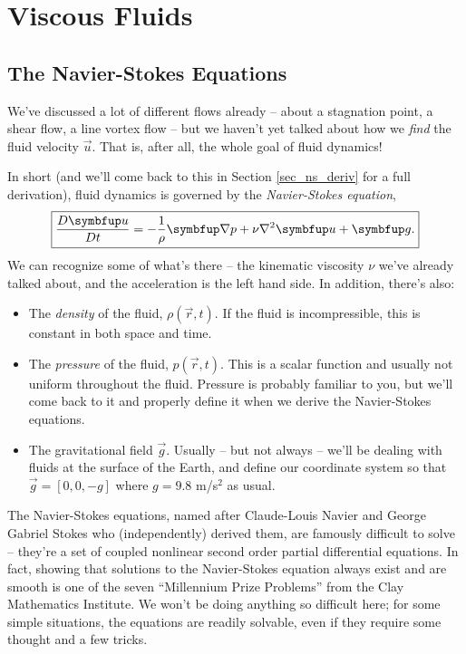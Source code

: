 \chapter{Viscous Fluids}

%
% 

\section{The Navier-Stokes Equations}

We've discussed a lot of different flows already -- about a stagnation point, a shear flow, a line vortex flow -- but we haven't yet talked about how we \emph{find} the fluid velocity $\vec{u}$.  That is, after all, the whole goal of fluid dynamics!

In short (and we'll come back to this in Section \ref{sec_ns_deriv} for a full derivation), fluid dynamics is governed by the \emph{Navier-Stokes equation},
\begin{equation}
\label{eq_navier_stokes}
\boxed{
\frac{D \vec{u}}{Dt} = -\frac{1}{\rho} \grad p + \nu \nabla^2 \vec{u} +  \vec{g}.
}
\end{equation}
We can recognize some of what's there -- the kinematic viscosity $\nu$ we've already talked about, and the acceleration is the left hand side.  In addition, there's also:
\begin{itemize}
\item The \emph{density} of the fluid, $\rho(\vec{r}, t)$.  If the fluid is incompressible, this is constant in both space and time.
\item The \emph{pressure} of the fluid, $p(\vec{r}, t)$.  This is a scalar function and usually not uniform throughout the fluid.  Pressure is probably familiar to you, but we'll come back to it and properly define it when we derive the Navier-Stokes equations.
\item The gravitational field $\vec{g}$.  Usually -- but not always -- we'll be dealing with fluids at the surface of the Earth, and define our coordinate system so that $\vec{g} = [0,0,-g]$ where $g = 9.8$ m/s$^2$ as usual. 
\end{itemize}

The Navier-Stokes equations, named after Claude-Louis Navier and George Gabriel Stokes who (independently) derived them, are famously difficult to solve -- they're a set of coupled nonlinear second order partial differential equations.  In fact, showing that solutions to the Navier-Stokes equation always exist and are smooth is one of the seven ``Millennium Prize Problems'' from the Clay Mathematics Institute.  We won't be doing anything so difficult here; for some simple situations, the equations are readily solvable, even if they require some thought and a few tricks.

